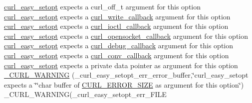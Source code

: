 \begin{DoxyCompactItemize}
\hyperlink{easy_8h_a7b171739b7bb728b3b58b2e6ec454aa0}{curl\+\_\+easy\+\_\+setopt} expects a curl\+\_\+off\+\_\+t argument for this option \hyperlink{easy_8h_a7b171739b7bb728b3b58b2e6ec454aa0}{curl\+\_\+easy\+\_\+setopt} expects a \hyperlink{curl_8h_ad65e62dcde45b356254b0f25f38dd802}{curl\+\_\+write\+\_\+callback} argument for this option \hyperlink{easy_8h_a7b171739b7bb728b3b58b2e6ec454aa0}{curl\+\_\+easy\+\_\+setopt} expects a \hyperlink{curl_8h_ae0524f6ec082005e39eb275c71c59a3b}{curl\+\_\+ioctl\+\_\+callback} argument for this option \hyperlink{easy_8h_a7b171739b7bb728b3b58b2e6ec454aa0}{curl\+\_\+easy\+\_\+setopt} expects a \hyperlink{curl_8h_a1b8b8f3e1a4e538a6bb1dd83a3388547}{curl\+\_\+opensocket\+\_\+callback} argument for this option \hyperlink{easy_8h_a7b171739b7bb728b3b58b2e6ec454aa0}{curl\+\_\+easy\+\_\+setopt} expects a \hyperlink{curl_8h_a50147c55283ee1fa3322b0d5aff2326c}{curl\+\_\+debug\+\_\+callback} argument for this option \hyperlink{easy_8h_a7b171739b7bb728b3b58b2e6ec454aa0}{curl\+\_\+easy\+\_\+setopt} expects a \hyperlink{curl_8h_acb230bf6dbf7bcb6e4e8740ea42ca3b3}{curl\+\_\+conv\+\_\+callback} argument for this option \hyperlink{easy_8h_a7b171739b7bb728b3b58b2e6ec454aa0}{curl\+\_\+easy\+\_\+setopt} expects a private data pointer as argument for this option \hyperlink{typecheck-gcc_8h_ae22d9c1d32c707914f070e1701b818b9}{\+\_\+\+C\+U\+R\+L\+\_\+\+W\+A\+R\+N\+I\+N\+G} (\+\_\+curl\+\_\+easy\+\_\+setopt\+\_\+err\+\_\+error\+\_\+buffer,\char`\"{}curl\+\_\+easy\+\_\+setopt expects a \char`\"{}\char`\"{}char buffer of \hyperlink{curl_8h_a9b030d9fa7b7487eb12d53c6188a2bde}{C\+U\+R\+L\+\_\+\+E\+R\+R\+O\+R\+\_\+\+S\+I\+Z\+E} as argument for this option\char`\"{}) \+\_\+\+C\+U\+R\+L\+\_\+\+W\+A\+R\+N\+I\+N\+G(\+\_\+curl\+\_\+easy\+\_\+setopt\+\_\+err\+\_\+\+F\+I\+L\+E
\item 

\end{DoxyCompactItemize}
